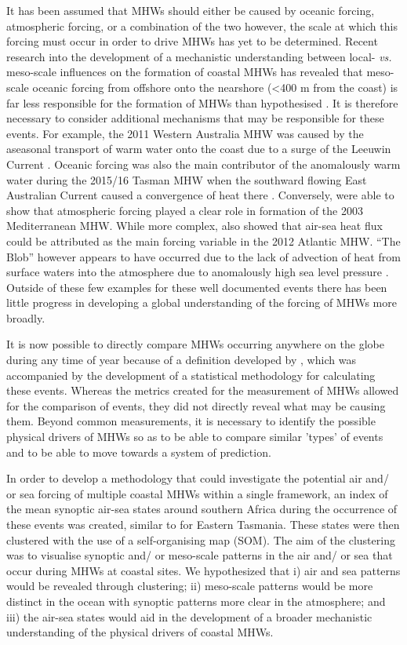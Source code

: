 \documentclass[a4paper,10pt,review]{elsarticle}
\begin{document}
It has been assumed that MHWs should either be caused by oceanic forcing, atmospheric forcing, or a combination of the two however, the scale at which this forcing must occur in order to drive MHWs has yet to be determined. Recent research into the development of a mechanistic understanding between local- \emph{vs.} meso-scale influences on the formation of coastal MHWs has revealed that meso-scale oceanic forcing from offshore onto the nearshore (<400 m from the coast) is far less responsible for the formation of MHWs than hypothesised \citep{Schlegel2017}. It is therefore necessary to consider additional mechanisms that may be responsible for these events. For example, the 2011 Western Australia MHW \citep{Pearce2013} was caused by the aseasonal transport of warm water onto the coast due to a surge of the Leeuwin Current \citep{Feng2013, Benthuysen2014}. Oceanic forcing was also the main contributor of the anomalously warm water during the 2015/16 Tasman MHW when the southward flowing East Australian Current caused a convergence of heat there \citep{Oliver2017}. Conversely, \citet{Garrabou2009} were able to show that atmospheric forcing played a clear role in formation of the 2003 Mediterranean MHW. While more complex, \citet{Chen2015a} also showed that air-sea heat flux could be attributed as the main forcing variable in the 2012 Atlantic MHW. ``The Blob'' however appears to have occurred due to the lack of advection of heat from surface waters into the atmosphere due to anomalously high sea level pressure \citep{Bond2015a}. Outside of these few examples for these well documented events there has been little progress in developing a global understanding of the forcing of MHWs more broadly.

It is now possible to directly compare MHWs occurring anywhere on the globe during any time of year because of a definition developed by \citet{Hobday2016}, which was accompanied by the development of a statistical methodology for calculating these events. Whereas the metrics created for the measurement of MHWs allowed for the comparison of events, they did not directly reveal what may be causing them. Beyond common measurements, it is necessary to identify the possible physical drivers of MHWs so as to be able to compare similar 'types' of events and to be able to move towards a system of prediction.

In order to develop a methodology that could investigate the potential air and/ or sea forcing of multiple coastal MHWs within a single framework, an index of the mean synoptic air-sea states around southern Africa during the occurrence of these events was created, similar to \citet{Oliver2017atlas} for Eastern Tasmania. These states were then clustered with the use of a self-organising map (SOM). The aim of the clustering was to visualise synoptic and/ or meso-scale patterns in the air and/ or sea that occur during MHWs at coastal sites. We hypothesized that i) air and sea patterns would be revealed through clustering; ii) meso-scale patterns would be more distinct in the ocean with synoptic patterns more clear in the atmosphere; and iii) the air-sea states would aid in the development of a broader mechanistic understanding of the physical drivers of coastal MHWs.
\end{document}
